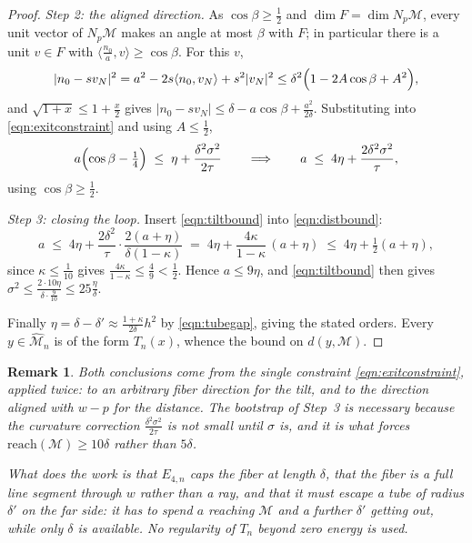\documentclass[11pt]{amsart}%
\theoremstyle{plain}
\newtheorem{remark}[definition]{Remark}
\newcommand{\1}{\mathbf{1}}
\newcommand{\M}{\mathcal{M}}
\begin{document}
\begin{proof}
    \emph{Step 2: the aligned direction.} As $\cos\beta\ge\frac{1}{2}$ and $\dim F=\dim N_p\M$, every unit
    vector of $N_p\M$ makes an angle at most $\beta$ with $F$; in particular there is a unit
    $v\in F$ with $\langle \frac{n_0}{a},v\rangle\ge\cos\beta$. For this $v$,
    \[
        |n_0-sv_N|^2 = a^2-2s\langle n_0,v_N\rangle+s^2|v_N|^2
        \le \delta^2\Bigl(1-2A\cos\beta+A^2\Bigr),
    \]
    and $\sqrt{1+x}\le1+\frac{x}{2}$ gives $|n_0-sv_N|\le\delta-a\cos\beta+\frac{a^2}{2\delta}$. Substituting into
    \eqref{eqn:exitconstraint} and using $A\le\frac{1}{2}$,
    \begin{equation}\label{eqn:distbound}
        a\Bigl(\cos\beta-\tfrac14\Bigr)\;\le\;\eta+\frac{\delta^2\sigma^2}{2\tau}
        \qquad\Longrightarrow\qquad
        a\;\le\;4\eta+\frac{2\delta^2\sigma^2}{\tau},
    \end{equation}
    using $\cos\beta\ge\frac{1}{2}$.

    \emph{Step 3: closing the loop.} Insert \eqref{eqn:tiltbound} into \eqref{eqn:distbound}:
    \[
        a\;\le\;4\eta+\frac{2\delta^2}{\tau}\cdot\frac{2(a+\eta)}{\delta(1-\kappa)}
        \;=\;4\eta+\frac{4\kappa}{1-\kappa}\,(a+\eta)
        \;\le\;4\eta+\tfrac12(a+\eta),
    \]
    since $\kappa\le\frac{1}{10}$ gives $\frac{4\kappa}{1-\kappa}\le\frac{4}{9}<\frac{1}{2}$. Hence $a\le9\eta$, and
    \eqref{eqn:tiltbound} then gives $\sigma^2\le \frac{2\cdot10\eta}{\delta\cdot\tfrac9{10}}\le25\frac{\eta}{\delta}$.

    Finally $\eta=\delta-\delta'\approx \frac{1+\kappa}{2\delta}h^2$ by \eqref{eqn:tubegap}, giving the
    stated orders. Every $y\in\widehat{\M}_n$ is of the form $T_n(x)$, whence the bound on
    $d(y,\M)$.
\end{proof}

\begin{remark}
    Both conclusions come from the single constraint \eqref{eqn:exitconstraint}, applied twice: to
    an arbitrary fiber direction for the tilt, and to the direction aligned with $w-p$ for the
    distance. The bootstrap of Step~3 is necessary because the curvature correction
    $\frac{\delta^2\sigma^2}{2\tau}$ is not small until $\sigma$ is, and it is what forces
    $\mathrm{reach}(\M)\ge10\delta$ rather than $5\delta$.

    What does the work is that $E_{4,n}$ caps the fiber at length $\delta$, that the fiber is
    a full line segment through $w$ rather than a ray, and that it must escape a tube of radius
    $\delta'$ on the far side: it has to spend $a$ reaching $\M$ and a further $\delta'$ getting out,
    while only $\delta$ is available. No regularity of $T_n$ beyond zero energy is used.
\end{remark}
\end{document}
